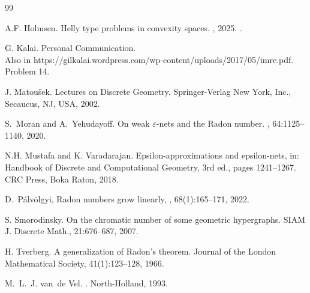 \documentclass[11pt]{article}
\theoremstyle{plain}
\theoremstyle{definition}
\theoremstyle{remark}
\begin{document}
\begin{thebibliography}{99}

A.F. Holmsen.
\newblock Helly type problems in convexity spaces.
, 2025.
.

G. Kalai.
Personal Communication.\\
Also in https://gilkalai.wordpress.com/wp-content/uploads/2017/05/imre.pdf.\\
Problem 14.

J. Matou\v{s}ek. 
Lectures on Discrete Geometry. Springer-Verlag New York, Inc., 
Secaucus, NJ, USA, 2002.

S.~Moran and A.~Yehudayoff.
\newblock On weak $\varepsilon$-nets and the Radon number.
, 64:1125--1140, 2020.

N.H. Mustafa and K. Varadarajan. 
Epsilon-approximations and epsilon-nets, in: Handbook of
Discrete and Computational Geometry, 3rd ed., 
pages 1241--1267. CRC Press, Boka Raton, 2018.

D.~P\'alv\"olgyi,
\newblock Radon numbers grow linearly,
, 68(1):165--171, 2022.


S. Smorodinsky. On the chromatic number 
of some geometric hypergraphs. SIAM J. Discrete
Math., 21:676–687, 2007.

H. Tverberg. A generalization of Radon’s theorem. 
Journal of the London Mathematical Society,
41(1):123--128, 1966.

M.~L.~J. van~de Vel.
.
\newblock North-Holland, 1993.
\end{thebibliography}
%
\end{document}

